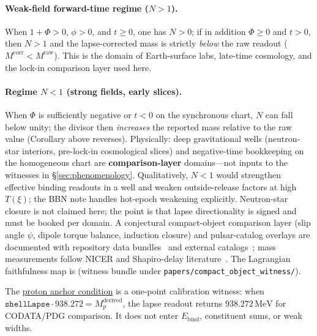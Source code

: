 \documentclass[11pt,notitlepage]{amsart}
\begin{document}
\paragraph{Weak-field forward-time regime ($N>1$).}
When $1+\Phi>0$, $\phi>0$, and $t\ge 0$, one has $N>0$; if in addition $\Phi\ge 0$
and $t>0$, then $N>1$ and the lapse-corrected mass is strictly \emph{below} the raw
readout ($M^{\mathrm{corr}}<M^{\mathrm{raw}}$). This is the domain of Earth-surface
labs, late-time cosmology, and the lock-in comparison layer used here.

\paragraph{Regime $N<1$ (strong fields, early slices).}
When $\Phi$ is sufficiently negative or $t<0$ on the synchronous chart, $N$ can fall
below unity; the divisor then \emph{increases} the reported mass relative to the raw
value (Corollary above reverses). Physically: deep gravitational wells (neutron-star
interiors, pre-lock-in cosmological slices) and negative-time bookkeeping on the
homogeneous chart are \textbf{comparison-layer} domains---not inputs to the witnesses
in \S\ref{sec:phenomenology}. Qualitatively, $N<1$ would strengthen effective binding
readouts in a well and weaken outside-release factors at high $T(\xi)$; the BBN note
\cite{hqiv-bbn-paper} handles hot-epoch weakening explicitly. Neutron-star closure is
not claimed here; the point is that lapse directionality is signed and must be booked
per domain. A conjectural compact-object comparison layer (slip angle $\psi$, dipole
torque balance, induction closure) and pulsar-catalog overlays are documented with
repository data bundles~\cite{hqiv-compact-object-witness-data,hqiv-pulsar-witness-data}
and external catalogs~\cite{atnf_psrcat,xao_atnf_pulsar_mirror,lorimer2004handbook};
mass measurements follow NICER and Shapiro-delay
literature~\cite{miller2019_j0030,riley2021_j0740,rutherford2024_msp_masses,freire2012_shapiro,antoniadis2013_ns_max,crombie2020_j0740}.
The Lagrangian faithfulness map is \cite{hqiv-lagrangian-faithfulness-audit}
(witness bundle under \texttt{papers/compact\_object\_witness/}).

The \hyperref[lean:proton-anchor]{proton anchor condition} is a one-point calibration
witness: when $\texttt{shellLapse}\cdot 938.272 = M_p^{\mathrm{derived}}$, the lapse
readout returns $938.272\,\mathrm{MeV}$ for CODATA/PDG comparison. It does not enter
$E_{\mathrm{bind}}$, constituent sums, or weak widths.
\end{document}
